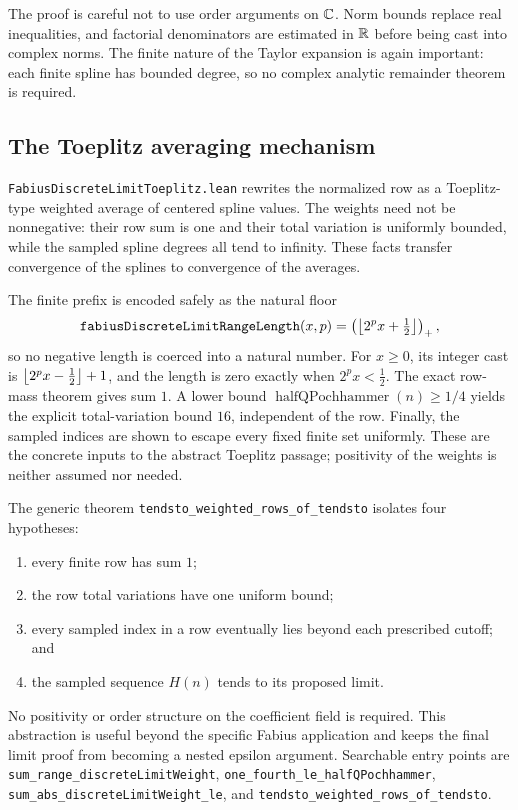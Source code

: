 \documentclass[11pt,oneside]{article}
\theoremstyle{definition}
\theoremstyle{remark}
\begin{document}
The proof is careful not to use order arguments on \(\mathbb{C}\).  Norm bounds replace real inequalities, and factorial denominators are estimated in \(\mathbb{R}\) before being cast into complex norms.  The finite nature of the Taylor expansion is again important: each finite spline has bounded degree, so no complex analytic remainder theorem is required.

\subsection{The Toeplitz averaging mechanism}
\nolinkurl{FabiusDiscreteLimitToeplitz.lean} rewrites the normalized row as a Toeplitz-type weighted average of centered spline values.  The weights need not be nonnegative: their row sum is one and their total variation is uniformly bounded, while the sampled spline degrees all tend to infinity.  These facts transfer convergence of the splines to convergence of the averages.

The finite prefix is encoded safely as the natural floor
\[
  \texttt{fabiusDiscreteLimitRangeLength}(x,p)
  =\left(\left\lfloor 2^p x+\tfrac12\right\rfloor\right)_{+},
\]
so no negative length is coerced into a natural number.  For \(x\geq0\), its
integer cast is
\(\left\lfloor 2^px-\tfrac12\right\rfloor+1\), and the length is zero exactly when
\(2^px<\tfrac12\).  The exact row-mass
theorem gives sum \(1\).  A lower bound
\(\operatorname{halfQPochhammer}(n)\geq1/4\) yields the explicit total-variation
bound \(16\), independent of the row.  Finally, the sampled indices are shown
to escape every fixed finite set uniformly.  These are the concrete inputs to
the abstract Toeplitz passage; positivity of the weights is neither assumed nor
needed.

The generic theorem \nolinkurl{tendsto_weighted_rows_of_tendsto} isolates four
hypotheses:
\begin{enumerate}
  \item every finite row has sum \(1\);
  \item the row total variations have one uniform bound;
  \item every sampled index in a row eventually lies beyond each prescribed
        cutoff; and
  \item the sampled sequence \(H(n)\) tends to its proposed limit.
\end{enumerate}
No positivity or order structure on the coefficient field is required.  This
abstraction is useful beyond the specific Fabius application and keeps the
final limit proof from becoming a nested epsilon argument.  Searchable entry
points are \nolinkurl{sum_range_discreteLimitWeight},
\nolinkurl{one_fourth_le_halfQPochhammer},
\nolinkurl{sum_abs_discreteLimitWeight_le}, and
\nolinkurl{tendsto_weighted_rows_of_tendsto}.
\end{document}
